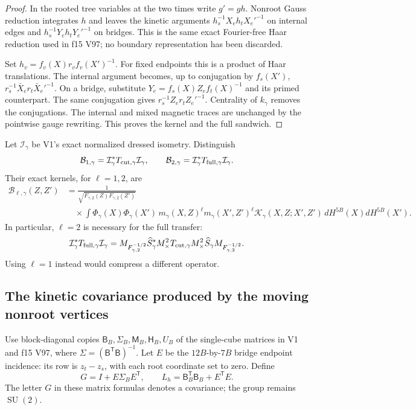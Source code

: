 \documentclass[11pt,oneside]{article}
\DeclareMathOperator{\SU}{SU}
\begin{document}
\begin{proof}
In the rooted tree variables at the two times write \(g'=gh\).
Nonroot Gauss reduction integrates \(h\) and leaves the kinetic
arguments \(h_s^{-1}X_eh_tX_e'^{-1}\) on internal edges and
\(h_s^{-1}Y_eh_tY_e'^{-1}\) on bridges.
This is the same exact Fourier-free Haar reduction used in
f15 V97; no boundary representation has been discarded.

Set \(h_v=f_v(X)r_vf_v(X')^{-1}\).
For fixed endpoints this is a product of Haar translations.
The internal argument becomes, up to conjugation by \(f_s(X')\),
\(r_s^{-1}\bar X_e r_t\bar X_e'^{-1}\).
On a bridge, substitute \(Y_e=f_s(X)Z_ef_t(X)^{-1}\) and its
primed counterpart. The same conjugation gives
\(r_s^{-1}Z_er_tZ_e'^{-1}\). Centrality of \(k_\gamma\) removes
the conjugations. The internal and mixed magnetic traces are
unchanged by the pointwise gauge rewriting.
This proves the kernel and the full sandwich.
\end{proof}

Let \(\mathcal I_\gamma\) be V1's exact normalized dressed
isometry. Distinguish
\[
 \mathcal B_{1,\gamma}=\mathcal I_\gamma^*
                  T_{\rm cut,\gamma}\mathcal I_\gamma,\qquad
 \mathcal B_{2,\gamma}=\mathcal I_\gamma^*
                  T_{\rm full,\gamma}\mathcal I_\gamma.
\]
Their exact kernels, for \(\ell=1,2\), are
\begin{equation}
 \begin{aligned}
 \mathcal B_{\ell,\gamma}(Z,Z')
 &=\frac{1}{\sqrt{F_{\gamma,2}(Z)F_{\gamma,2}(Z')}}\\
 &\quad\times\int \Phi_\gamma(X)\Phi_\gamma(X')\,
      m_\gamma(X,Z)^\ell m_\gamma(X',Z')^\ell
      \mathcal K_\gamma(X,Z;X',Z')\,dH^{5B}(X)dH^{5B}(X').
 \end{aligned}
 \label{f16v2:exact-compression}
\end{equation}
In particular, \(\ell=2\) is necessary for the full transfer:
\[
 \mathcal I_\gamma^*T_{\rm full,\gamma}\mathcal I_\gamma
 =M_{F_{\gamma,2}^{-1/2}}\widehat S_\gamma^*
      M_\times^2T_{\rm cut,\gamma}M_\times^2\widehat S_\gamma
                                      M_{F_{\gamma,2}^{-1/2}}.
\]
Using \(\ell=1\) instead would compress a different operator.

\subsection{The kinetic covariance produced by the moving nonroot vertices}

Use block-diagonal copies \(\mathsf B_B,\Sigma_B,\mathsf M_B,
\mathsf H_B,U_B\) of the single-cube matrices in V1 and f15 V97,
where \(\Sigma=(\mathsf B^{\mathsf T}\mathsf B)^{-1}\).
Let \(E\) be the \(12B\)-by-\(7B\) bridge endpoint incidence:
its row is \(z_t-z_s\), with each root coordinate set to zero.
Define
\begin{equation}
 G=I+E\Sigma_BE^{\mathsf T},\qquad
 L_h=\mathsf B_B^{\mathsf T}\mathsf B_B+E^{\mathsf T}E.
 \label{f16v2:G}
\end{equation}
The letter \(G\) in these matrix formulas denotes a covariance;
the group remains \(\SU(2)\).
\end{document}
